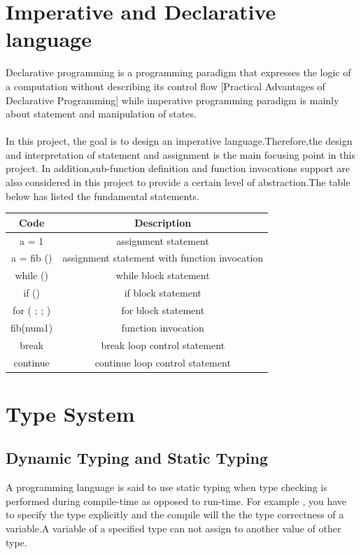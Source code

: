 \section{Imperative and Declarative language}
Declarative programming is a programming paradigm that expresses the logic of a computation without describing its control flow [Practical Advantages of Declarative Programming] while imperative programming paradigm is mainly about statement and manipulation of states.
\\ \\
In this project, the goal is to design an imperative language.Therefore,the design and interpretation of statement and assignment is the main focusing point in this project.
In addition,sub-function definition and function invocations support are also considered in this project to provide a certain level of abstraction.The table below has listed the fundamental statements.\\


\begin{tabular}{c|c}
\hline \textbf{Code} & \textbf{Description} \\
\hline  a = 1  &   assignment statement \\
\hline  a = fib () &  assignment statement with function invocation \\
\hline  while () {}&  while block statement\\
\hline if () {} &   if block statement \\
\hline for ( ; ; ) {} &  for block statement \\
\hline  fib(num1) &   function invocation  \\
\hline  break &   break loop control statement \\
\hline continue &   continue loop control statement \\
\hline 
\end{tabular} 

\section{Type System}
\subsection{Dynamic Typing and Static Typing}
A programming language is said to use static typing when type checking is performed during compile-time as opposed to run-time. 
For example , you have to specify the type explicitly and the compile will the the type correctness of a variable.A variable of a specified type can not assign to another value of other type.

